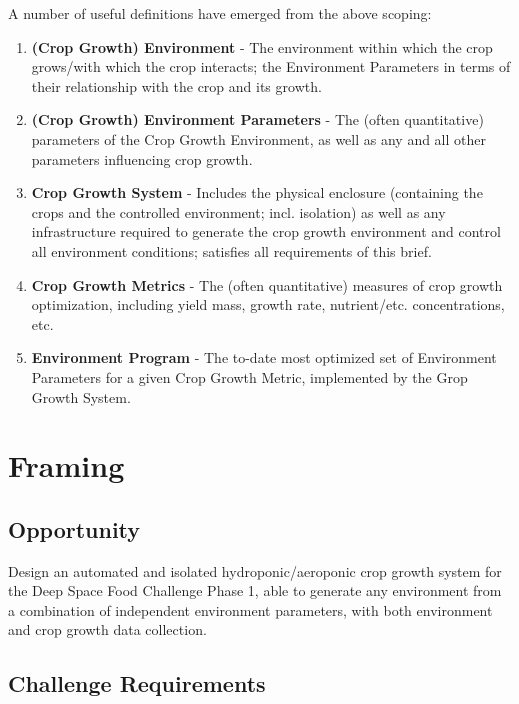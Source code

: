 \documentclass{report}
\begin{document}
A number of useful definitions have emerged from the above scoping:
\begin{enumerate}
\item \textbf{(Crop Growth) Environment} - The environment within which the crop grows/with which the crop interacts; the Environment Parameters in terms of their relationship with the crop and its growth.
\item \textbf{(Crop Growth) Environment Parameters} - The (often quantitative) parameters of the Crop Growth Environment, as well as any and all other parameters influencing crop growth.
\item \textbf{Crop Growth System} - Includes the physical enclosure (containing the crops and the controlled environment; incl. isolation) as well as any infrastructure required to generate the crop growth environment and control all environment conditions; satisfies all requirements of this brief.
\item \textbf{Crop Growth Metrics} - The (often quantitative) measures of crop growth optimization, including yield mass, growth rate, nutrient/etc. concentrations, etc.
\item \textbf{Environment Program} - The to-date most optimized set of Environment Parameters for a given Crop Growth Metric, implemented by the Grop Growth System.
\end{enumerate}

\newpage
\section{Framing}
\label{sec:framing}

\subsection{Opportunity}
\label{sec:opportunity}

Design an automated and isolated hydroponic/aeroponic crop growth system for the Deep Space Food Challenge Phase 1\cite{dsfc}, able to generate any environment from a combination of independent environment parameters, with both environment and crop growth data collection.

\subsection{Challenge Requirements}
\label{sec:requirements}
\end{document}
